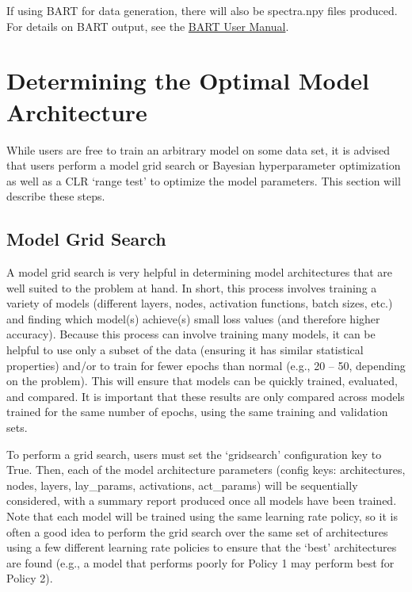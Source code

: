 \documentclass[letterpaper, 12pt]{article}
\begin{document}
\noindent If using BART for data generation, there will also be spectra.npy files produced.  For details on BART output, see the \href{https://exosports.github.io/BART/doc/BART_User_Manual.html}{BART User Manual}.

\section{Determining the Optimal Model Architecture}
\label{sec:optarch}
While users are free to train an arbitrary model on some data set, it is 
advised that users perform a model grid search or Bayesian hyperparameter 
optimization as well as a CLR `range test' to optimize the model parameters.  
This section will describe these steps.

\subsection{Model Grid Search}

A model grid search is very helpful in determining model architectures that are 
well suited to the problem at hand.  In short, this process involves training 
a variety of models (different layers, nodes, activation functions, batch 
sizes, etc.) and finding which model(s) achieve(s) small loss values (and 
therefore higher accuracy).  Because this process can involve training 
many models, it can be  helpful to use only a subset of the data (ensuring 
it has similar statistical properties) and/or to train for fewer epochs than 
normal (e.g., 20 -- 50, depending on the problem).  This will ensure that 
models can be quickly trained, evaluated, and compared.  It is important 
that these results are only compared across models trained for the same 
number of epochs, using the same training and validation sets. \newline

\noindent To perform a grid search, users must set the `gridsearch' 
configuration key to True.  Then, each of the model architecture parameters 
(config keys: architectures, nodes, layers, lay\_params, activations, 
act\_params)
will be sequentially considered, with a summary report produced once all 
models have been trained.  Note that each model will be trained using the same 
learning rate policy, so it is often a good idea to perform the grid search over
the same set of architectures using a few different learning rate policies to 
ensure that the `best' architectures are found (e.g., a model that performs 
poorly for Policy 1 may perform best for Policy 2). \newline
\end{document}
